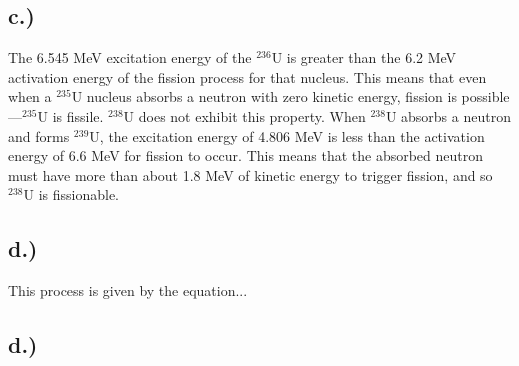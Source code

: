 \documentclass{report}
\begin{document}
\subsection*{c.)}

The 6.545 MeV excitation energy of the $^{236}$U is greater than the 6.2 MeV activation energy of the fission process for that nucleus. This means that even when a $^{235}$U nucleus absorbs a neutron with zero kinetic energy, fission is possible---$^{235}$U is fissile. $^{238}$U does not exhibit this property. When $^{238}$U absorbs a neutron and forms $^{239}$U, the excitation energy of 4.806 MeV is less than the activation energy of 6.6 MeV for fission to occur. This means that the absorbed neutron must have more than about 1.8 MeV of kinetic energy to trigger fission, and so $^{238}$U is fissionable.


\subsection*{d.)}

This process is given by the equation...

\subsection*{d.)}
\end{document}
